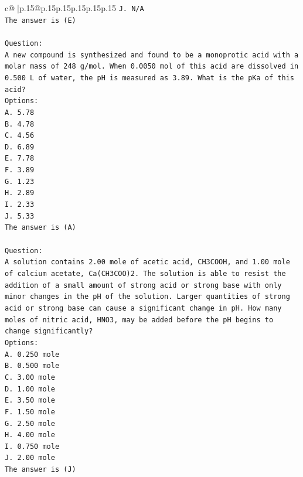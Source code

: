 \documentclass{article}
\begin{document}
{\begin{supertabular}{c@{$\;$}|p{.15\linewidth}@{}p{.15\linewidth}p{.15\linewidth}p{.15\linewidth}p{.15\linewidth}p{.15\linewidth}}
{{{\texttt{J. N/A} \\
\texttt{The answer is (E)} \\
\\ 
\texttt{Question:} \\
\texttt{A new compound is synthesized and found to be a monoprotic acid with a molar mass of 248 g/mol. When 0.0050 mol of this acid are dissolved in 0.500 L of water, the pH is measured as 3.89. What is the pKa of this acid?} \\
\texttt{Options:} \\
\texttt{A. 5.78} \\
\texttt{B. 4.78} \\
\texttt{C. 4.56} \\
\texttt{D. 6.89} \\
\texttt{E. 7.78} \\
\texttt{F. 3.89} \\
\texttt{G. 1.23} \\
\texttt{H. 2.89} \\
\texttt{I. 2.33} \\
\texttt{J. 5.33} \\
\texttt{The answer is (A)} \\
\\ 
\texttt{Question:} \\
\texttt{A solution contains 2.00 mole of acetic acid, CH3COOH, and 1.00 mole of calcium acetate, Ca(CH3COO)2. The solution is able to resist the addition of a small amount of strong acid or strong base with only minor changes in the pH of the solution. Larger quantities of strong acid or strong base can cause a significant change in pH. How many moles of nitric acid, HNO3, may be added before the pH begins to change significantly?} \\
\texttt{Options:} \\
\texttt{A. 0.250 mole} \\
\texttt{B. 0.500 mole} \\
\texttt{C. 3.00 mole} \\
\texttt{D. 1.00 mole} \\
\texttt{E. 3.50 mole} \\
\texttt{F. 1.50 mole} \\
\texttt{G. 2.50 mole} \\
\texttt{H. 4.00 mole} \\
\texttt{I. 0.750 mole} \\
\texttt{J. 2.00 mole} \\
\texttt{The answer is (J)} \\
}}}
\end{supertabular}}
\end{document}
